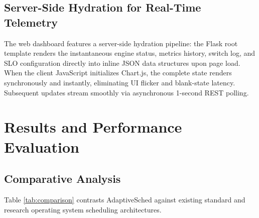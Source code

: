 \documentclass[journal]{IEEEtran}
\begin{document}
\subsection{Server-Side Hydration for Real-Time Telemetry}
The web dashboard features a server-side hydration pipeline: the Flask root template renders the instantaneous engine status, metrics history, switch log, and SLO configuration directly into inline JSON data structures upon page load. When the client JavaScript initializes Chart.js, the complete state renders synchronously and instantly, eliminating UI flicker and blank-state latency. Subsequent updates stream smoothly via asynchronous 1-second REST polling.

\section{Results and Performance Evaluation}
\label{sec:results}

\subsection{Comparative Analysis}
Table \ref{tab:comparison} contrasts AdaptiveSched against existing standard and research operating system scheduling architectures.
\end{document}
